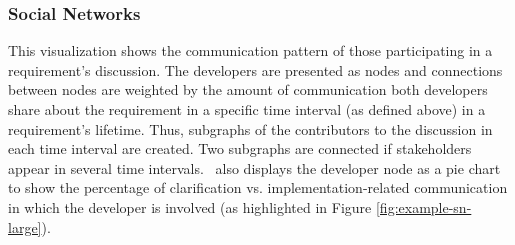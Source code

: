 \subsubsection{Social Networks} 
This visualization shows the communication pattern of those participating in a requirement's discussion. 
The developers are presented as nodes and connections between nodes are weighted by the amount of communication both developers share about the requirement in a specific time interval (as defined above) in a requirement's lifetime. 
Thus, subgraphs of the contributors to the discussion in each time interval are created.
Two subgraphs are connected if  stakeholders appear in several time intervals. 
\viss\ also displays the developer node as a pie chart to show the percentage of clarification vs. implementation-related communication in which the developer is involved (as highlighted in Figure \ref{fig:example-sn-large}).





